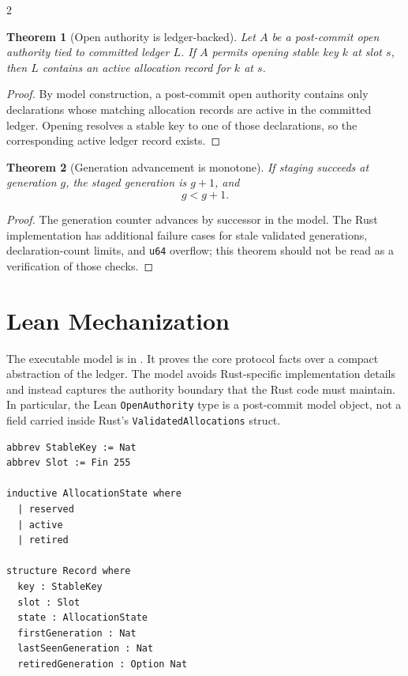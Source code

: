 \documentclass[11pt]{article}
\newtheorem{theorem}{Theorem}
\begin{document}
\begin{multicols}{2}
\begin{theorem}[Open authority is ledger-backed]
Let \(A\) be a post-commit open authority tied to committed ledger \(L\). If
\(A\) permits opening stable key \(k\) at slot \(s\), then \(L\) contains an
active allocation record for \(k\) at \(s\).
\end{theorem}

\begin{proof}
By model construction, a post-commit open authority contains only declarations
whose matching allocation records are active in the committed ledger. Opening
resolves a stable key to one of those declarations, so the corresponding active
ledger record exists.
\end{proof}

\begin{theorem}[Generation advancement is monotone]
If staging succeeds at generation \(g\), the staged generation is \(g+1\), and
\[
  g < g + 1.
\]
\end{theorem}

\begin{proof}
The generation counter advances by successor in the model. The Rust
implementation has additional failure cases for stale validated generations,
declaration-count limits, and \texttt{u64} overflow; this theorem should not be
read as a verification of those checks.
\end{proof}

\section{Lean Mechanization}

The executable model is in . It proves the
core protocol facts over a compact abstraction of the ledger. The model avoids
Rust-specific implementation details and instead captures the authority
boundary that the Rust code must maintain. In particular, the Lean
\texttt{OpenAuthority} type is a post-commit model object, not a field carried
inside Rust's \texttt{ValidatedAllocations} struct.

\begin{lstlisting}[language=Lean,caption={Core allocation records and ledger invariants.}]
abbrev StableKey := Nat
abbrev Slot := Fin 255

inductive AllocationState where
  | reserved
  | active
  | retired

structure Record where
  key : StableKey
  slot : Slot
  state : AllocationState
  firstGeneration : Nat
  lastSeenGeneration : Nat
  retiredGeneration : Option Nat


\end{lstlisting}
\end{multicols}
\end{document}
